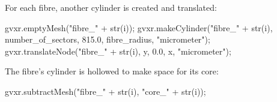 \documentclass[11pt]{article}
\newenvironment{Shaded}{}{}
\newcommand{\FloatTok}[1]{\textcolor[rgb]{0.25,0.63,0.44}{{#1}}}
\newcommand{\StringTok}[1]{\textcolor[rgb]{0.25,0.44,0.63}{{#1}}}
\newcommand{\NormalTok}[1]{{#1}}
\newcommand{\OperatorTok}[1]{\textcolor[rgb]{0.40,0.40,0.40}{{#1}}}
\newcommand{\BuiltInTok}[1]{{#1}}
\begin{document}
For each fibre, another cylinder is created and translated:

\begin{Shaded}
\begin{Highlighting}[]
\NormalTok{        gvxr.emptyMesh(}\StringTok{"fibre\_"}  \OperatorTok{+} \BuiltInTok{str}\NormalTok{(i))}\OperatorTok{;}
\NormalTok{        gvxr.makeCylinder(}\StringTok{"fibre\_"}  \OperatorTok{+} \BuiltInTok{str}\NormalTok{(i), number\_of\_sectors, }\FloatTok{815.0}\NormalTok{,  fibre\_radius, }\StringTok{"micrometer"}\NormalTok{)}\OperatorTok{;}
\NormalTok{        gvxr.translateNode(}\StringTok{"fibre\_"}  \OperatorTok{+} \BuiltInTok{str}\NormalTok{(i), y, }\FloatTok{0.0}\NormalTok{, x, }\StringTok{"micrometer"}\NormalTok{)}\OperatorTok{;}
\end{Highlighting}
\end{Shaded}

The fibre's cylinder is hollowed to make space for its core:

\begin{Shaded}
\begin{Highlighting}[]
\NormalTok{        gvxr.subtractMesh(}\StringTok{"fibre\_"} \OperatorTok{+} \BuiltInTok{str}\NormalTok{(i), }\StringTok{"core\_"} \OperatorTok{+} \BuiltInTok{str}\NormalTok{(i))}\OperatorTok{;}
\end{Highlighting}
\end{Shaded}
\end{document}
